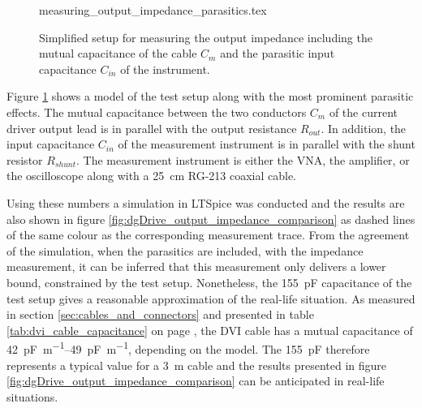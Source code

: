 \begin{figure}[ht]
    \centering
        {measuring_output_impedance_parasitics.tex}
    \caption{Simplified setup for measuring the output impedance including the mutual capacitance of the cable $C_m$ and the parasitic input capacitance $C_{in}$ of the instrument.}
    \label{fig:measuring_output_impedance_parasitics}
\end{figure}

Figure \ref{fig:measuring_output_impedance_parasitics} shows a model of the test setup along with the most prominent parasitic effects. The mutual capacitance between the two conductors $C_m$ of the current driver output lead is in parallel with the output resistance $R_{out}$. In addition, the input capacitance $C_{in}$ of the measurement instrument is in parallel with the shunt resistor $R_{shunt}$. The measurement instrument is either the  VNA, the  amplifier, or the  oscilloscope along with a \qty{25}{\cm} RG-213 coaxial cable.

Using these numbers a simulation in LTSpice was conducted and the results are also shown in figure \ref{fig:dgDrive_output_impedance_comparison} as dashed lines of the same colour as the corresponding measurement trace. From the agreement of the simulation, when the parasitics are included, with the impedance measurement, it can be inferred that this measurement only delivers a lower bound, constrained by the test setup. Nonetheless, the \qty{155}{\pF} capacitance of the test setup gives a reasonable approximation of the real-life situation. As measured in section \ref{sec:cables_and_connectors} and presented in table \ref{tab:dvi_cable_capacitance} on page \pageref{tab:dvi_cable_capacitance}, the DVI cable has a mutual capacitance of \qtyrange[range-units = single]{42}{49}{\pF \per \m}, depending on the model. The \qty{155}{\pF} therefore represents a typical value for a \qty{3}{\m} cable and the results presented in figure \ref{fig:dgDrive_output_impedance_comparison} can be anticipated in real-life situations.


